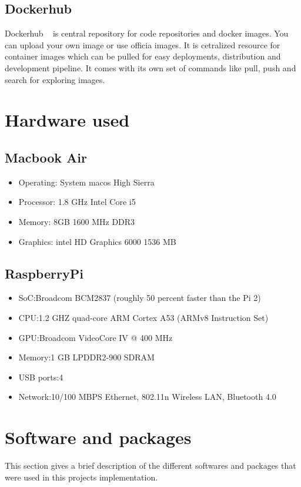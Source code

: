 \subsection{Dockerhub}

Dockerhub ~\cite{hid-sp18-413-dockerhub} is central repository for
code repositories and docker images. You can upload your own image or
use officia images. It is cetralized resource for container images
which can be pulled for easy deployments, distribution and development
pipeline. It comes with its own set of commands like pull, push and
search for exploring images.

\section{Hardware used}
\subsection{Macbook Air}
\begin{itemize}
\item Operating: System macos High Sierra
\item Processor: 1.8 GHz Intel Core i5
\item Memory: 8GB 1600 MHz DDR3
\item Graphics: intel HD Graphics 6000 1536 MB
\end{itemize}

\subsection{RaspberryPi}
\begin{itemize}
\item SoC:Broadcom BCM2837 (roughly 50 percent faster than the Pi 2)
\item CPU:1.2 GHZ quad-core ARM Cortex A53 (ARMv8 Instruction Set)
\item GPU:Broadcom VideoCore IV @ 400 MHz
\item Memory:1 GB LPDDR2-900 SDRAM
\item USB ports:4
\item Network:10/100 MBPS Ethernet, 802.11n Wireless LAN, Bluetooth
  4.0
\end{itemize}

\section{Software and packages}
This section gives a brief description of the different softwares and
packages that were used in this projects implementation.

